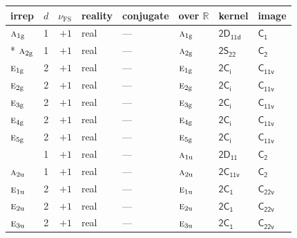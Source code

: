 \documentclass[10pt,a4paper]{article}
\numberwithin{equation}{section}
\newcommand{\grp}[1]{\mathsf{#1}}
\newcommand{\irr}[1]{\text{\normalfont\scshape #1}}
\newcommand{\detbox}[1]{{\setlength{\fboxsep}{1pt}\fbox{#1}}}
\newcommand{\ptag}[1]{\mathrm{#1}}
\newcommand{\fsind}{\nu_{\mathrm{FS}}}
\begin{document}
{\small\renewcommand{\arraystretch}{1.25}\setlength{\tabcolsep}{4pt}\begin{longtable}{@{}lrrlllll@{}}\toprule
irrep & $d$ & $\fsind$ & reality & conjugate & over $\mathbb{R}$ & kernel & image\\\midrule\endhead
\bottomrule\endfoot\endlastfoot
$\irr{a}_{1\ptag{g}}$ & 1 & $+1$ & real & --- & $\irr{a}_{1\ptag{g}}$ & \href{2D11d.pdf}{$\grp{2D_{11d}}$} & \href{../../../rotation/data/pdf/C1.pdf}{$\grp{C_{1}}$}\\*
$\irr{a}_{2\ptag{g}}$ & 1 & $+1$ & real & --- & $\irr{a}_{2\ptag{g}}$ & \href{2S22.pdf}{$\grp{2S_{22}}$} & \href{../../../rotation/data/pdf/C2.pdf}{$\grp{C_{2}}$}\\
$\irr{e}_{1\ptag{g}}$ & 2 & $+1$ & real & --- & $\irr{e}_{1\ptag{g}}$ & \href{2S2.pdf}{$\grp{2C_{i}}$} & \href{../../../rotation/data/pdf/C11v.pdf}{$\grp{C_{11v}}$}\\
$\irr{e}_{2\ptag{g}}$ & 2 & $+1$ & real & --- & $\irr{e}_{2\ptag{g}}$ & \href{2S2.pdf}{$\grp{2C_{i}}$} & \href{../../../rotation/data/pdf/C11v.pdf}{$\grp{C_{11v}}$}\\
$\irr{e}_{3\ptag{g}}$ & 2 & $+1$ & real & --- & $\irr{e}_{3\ptag{g}}$ & \href{2S2.pdf}{$\grp{2C_{i}}$} & \href{../../../rotation/data/pdf/C11v.pdf}{$\grp{C_{11v}}$}\\
$\irr{e}_{4\ptag{g}}$ & 2 & $+1$ & real & --- & $\irr{e}_{4\ptag{g}}$ & \href{2S2.pdf}{$\grp{2C_{i}}$} & \href{../../../rotation/data/pdf/C11v.pdf}{$\grp{C_{11v}}$}\\
$\irr{e}_{5\ptag{g}}$ & 2 & $+1$ & real & --- & $\irr{e}_{5\ptag{g}}$ & \href{2S2.pdf}{$\grp{2C_{i}}$} & \href{../../../rotation/data/pdf/C11v.pdf}{$\grp{C_{11v}}$}\\
\detbox{$\irr{a}_{1\ptag{u}}$} & 1 & $+1$ & real & --- & $\irr{a}_{1\ptag{u}}$ & \href{2D11.pdf}{$\grp{2D_{11}}$} & \href{../../../rotation/data/pdf/C2.pdf}{$\grp{C_{2}}$}\\
$\irr{a}_{2\ptag{u}}$ & 1 & $+1$ & real & --- & $\irr{a}_{2\ptag{u}}$ & \href{2C11v.pdf}{$\grp{2C_{11v}}$} & \href{../../../rotation/data/pdf/C2.pdf}{$\grp{C_{2}}$}\\
$\irr{e}_{1\ptag{u}}$ & 2 & $+1$ & real & --- & $\irr{e}_{1\ptag{u}}$ & \href{2C1.pdf}{$\grp{2C_{1}}$} & $\grp{C_{22v}}$\\
$\irr{e}_{2\ptag{u}}$ & 2 & $+1$ & real & --- & $\irr{e}_{2\ptag{u}}$ & \href{2C1.pdf}{$\grp{2C_{1}}$} & $\grp{C_{22v}}$\\
$\irr{e}_{3\ptag{u}}$ & 2 & $+1$ & real & --- & $\irr{e}_{3\ptag{u}}$ & \href{2C1.pdf}{$\grp{2C_{1}}$} & $\grp{C_{22v}}$\\

\end{longtable}}
\end{document}

